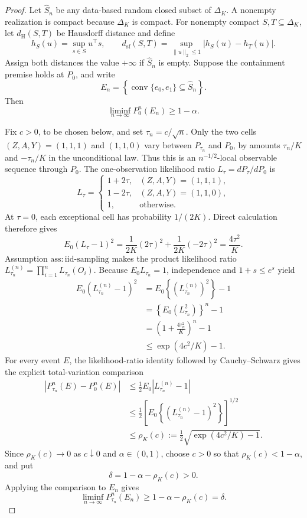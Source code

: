\documentclass{article}
\begin{document}
\begin{proof}
Let \(\widehat S_n\) be any data-based random closed subset of \(\Delta_K\).  A nonempty realization is compact because \(\Delta_K\) is compact.  For nonempty compact \(S,T\subseteq\Delta_K\), let \(d_{\mathrm H}(S,T)\) be Hausdorff distance and define
\[
 h_S(u)=\sup_{s\in S}u^\top s,
 \qquad
 d_{\mathrm{sf}}(S,T)
 =\sup_{\lVert u\rVert_2\leq1}|h_S(u)-h_T(u)|.
\]
Assign both distances the value \(+\infty\) if \(\widehat S_n\) is empty.  Suppose the containment premise holds at \(P_0\), and write
\[
 E_n=\left\{\operatorname{conv}\{e_0,e_1\}\subseteq\widehat S_n\right\}.
\]
Then
\[
 \liminf_{n\to\infty}P_0^n(E_n)\geq1-\alpha.
\]

Fix \(c>0\), to be chosen below, and set \(\tau_n=c/\sqrt n\).  Only the two cells \((Z,A,Y)=(1,1,1)\) and \((1,1,0)\) vary between \(P_{\tau_n}\) and \(P_0\), by amounts \(\tau_n/K\) and \(-\tau_n/K\) in the unconditional law.  Thus this is an \(n^{-1/2}\)-local observable sequence through \(P_0\).  The one-observation likelihood ratio \(L_\tau=dP_\tau/dP_0\) is
\[
 L_\tau=
 \begin{cases}
 1+2\tau,&(Z,A,Y)=(1,1,1),\\
 1-2\tau,&(Z,A,Y)=(1,1,0),\\
 1,&\text{otherwise}.
 \end{cases}
\]
At \(\tau=0\), each exceptional cell has probability \(1/(2K)\).  Direct calculation therefore gives
\[
 E_0(L_\tau-1)^2
 =\frac{1}{2K}(2\tau)^2+\frac{1}{2K}(-2\tau)^2
 =\frac{4\tau^2}{K}.
\]
Assumption \(\mathrm{ass{:}iid\text{-}sampling}\) makes the product likelihood ratio \(L_{\tau_n}^{(n)}=\prod_{i=1}^nL_{\tau_n}(O_i)\).  Because \(E_0L_{\tau_n}=1\), independence and \(1+s\leq e^s\) yield
\[
 \begin{aligned}
 E_0\!\left(L_{\tau_n}^{(n)}-1\right)^2
 &=E_0\!\left\{(L_{\tau_n}^{(n)})^2\right\}-1\\
 &=\left\{E_0(L_{\tau_n}^2)\right\}^n-1\\
 &=\left(1+\frac{4\tau_n^2}{K}\right)^n-1\\
 &\leq \exp(4c^2/K)-1.
 \end{aligned}
\]
For every event \(E\), the likelihood-ratio identity followed by Cauchy--Schwarz gives the explicit total-variation comparison
\[
 \begin{aligned}
 |P_{\tau_n}^n(E)-P_0^n(E)|
 &\leq\frac12E_0|L_{\tau_n}^{(n)}-1|\\
 &\leq\frac12\left[E_0\!\left\{(L_{\tau_n}^{(n)}-1)^2\right\}\right]^{1/2}\\
 &\leq \rho_K(c):=\frac12\sqrt{\exp(4c^2/K)-1}.
 \end{aligned}
\]
Since \(\rho_K(c)\to0\) as \(c\downarrow0\) and \(\alpha\in(0,1)\), choose \(c>0\) so that \(\rho_K(c)<1-\alpha\), and put
\[
 \delta=1-\alpha-\rho_K(c)>0.
\]
Applying the comparison to \(E_n\) gives
\[
 \liminf_{n\to\infty}P_{\tau_n}^n(E_n)
 \geq1-\alpha-\rho_K(c)=\delta.
\]


\end{proof}
\end{document}
